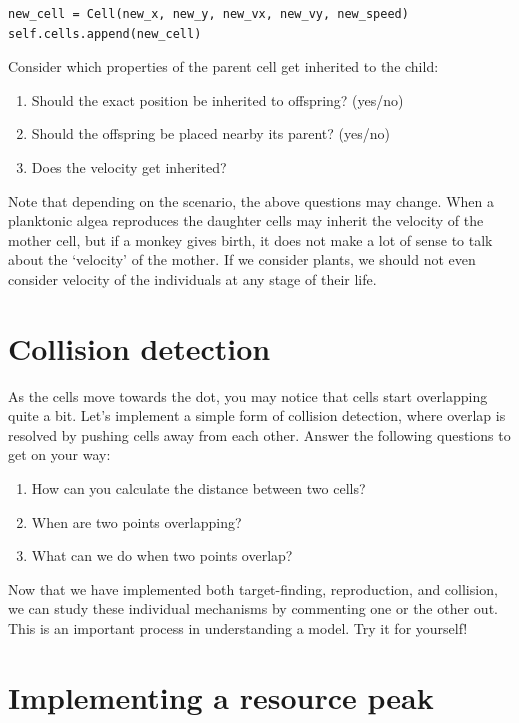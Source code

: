 \documentclass[
  letterpaper,
  DIV=11,
  numbers=noendperiod]{scrreprt}
\providecommand{\tightlist}{%
  \setlength{\itemsep}{0pt}\setlength{\parskip}{0pt}}\usepackage{longtable,booktabs,array}
\theoremstyle{definition}
\theoremstyle{remark}
\begin{document}
\begin{verbatim}
new_cell = Cell(new_x, new_y, new_vx, new_vy, new_speed)
self.cells.append(new_cell)
\end{verbatim}

Consider which properties of the parent cell get inherited to the child:

\begin{enumerate}
\def\labelenumi{\alph{enumi}.}
\tightlist
\item
  Should the exact position be inherited to offspring? (yes/no)
\item
  Should the offspring be placed nearby its parent? (yes/no)
\item
  Does the velocity get inherited?
\end{enumerate}

Note that depending on the scenario, the above questions may change.
When a planktonic algea reproduces the daughter cells may inherit the
velocity of the mother cell, but if a monkey gives birth, it does not
make a lot of sense to talk about the `velocity' of the mother. If we
consider plants, we should not even consider velocity of the individuals
at any stage of their life.

\section{Collision detection}\label{sec-collision}

As the cells move towards the dot, you may notice that cells start
overlapping quite a bit. Let's implement a simple form of collision
detection, where overlap is resolved by pushing cells away from each
other. Answer the following questions to get on your way:

\begin{enumerate}
\def\labelenumi{\alph{enumi}.}
\tightlist
\item
  How can you calculate the distance between two cells?
\item
  When are two points overlapping?
\item
  What can we do when two points overlap?
\end{enumerate}

Now that we have implemented both target-finding, reproduction, and
collision, we can study these individual mechanisms by commenting one or
the other out. This is an important process in understanding a model.
Try it for yourself!

\section{Implementing a resource peak}\label{sec-resourcepeak}
\end{document}

